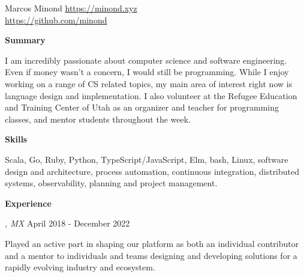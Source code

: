 \documentclass[10pt]{article}
\newcommand{\SectionTitle}[1] {
  \vspace{.25in}
  \textbf{\large #1}
  \vspace{.1in}
}
\newcommand{\DescribedEntry}[4] {
  \noindent \textit{\strong{#1}, #2} \hfill #3
  \vspace{.05in}

  #4
}
\begin{document}
\begin{flushleft}

\huge{Marcos Minond} \normalsize
  \hfill \href{https://minond.xyz}{https://minond.xyz} \\
  \hfill \href{https://github.com/minond}{https://github.com/minond}

\normalsize


\SectionTitle{Summary}

I am incredibly passionate about computer science and software engineering.
Even if money wasn’t a concern, I would still be programming. While I enjoy
working on a range of CS related topics, my main area of interest right
now is language design and implementation. I also volunteer at the Refugee
Education and Training Center of Utah as an organizer and teacher for
programming classes, and mentor students throughout the week.


\SectionTitle{Skills}

Scala, Go, Ruby, Python, TypeScript/JavaScript, Elm, bash, Linux, software
design and architecture, process automation, continuous integration,
distributed systems, observability, planning and project management.


\SectionTitle{Experience}

\DescribedEntry{Staff Engineer}{MX}{April 2018 - December 2022}{
Played an active part in shaping our platform as both an individual contributor and a mentor to individuals and teams designing and developing solutions for a rapidly evolving industry and ecosystem.

}
\end{flushleft}
\end{document}
